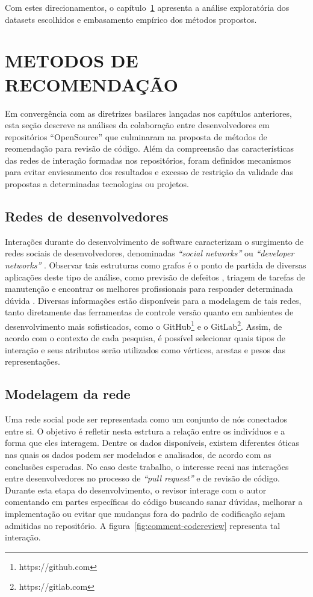 \documentclass[12pt,openany,oneside,a4paper,english,brazil]{abntbibufjf}
\begin{document}
Com estes direcionamentos, o capítulo~\ref{chap:metodos} apresenta a análise exploratória dos datasets escolhidos e embasamento empírico dos métodos propostos.

\chapter{METODOS DE RECOMENDAÇÃO}\label{chap:metodos}

Em convergência com as diretrizes basilares lançadas nos capítulos anteriores, esta seção descreve as análises da colaboração entre desenvolvedores em repositórios ``OpenSource'' que culminaram na proposta de métodos de reomendação para revisão de código. Além da compreensão das características das redes de interação formadas nos repositórios, foram definidos mecanismos para evitar enviesamento dos resultados e excesso de restrição da validade das propostas a determinadas tecnologias ou projetos.

\section{Redes de desenvolvedores}

Interações durante do desenvolvimento de software caracterizam o surgimento de redes sociais de desenvolvedores, denominadas \textit{``social networks''} ou \textit{``developer networks''} \cite{lopez2004}. Observar tais estruturas como grafos é o ponto de partida de diversas aplicações deste tipo de análise, como previsão de defeitos \cite{meneely2008}, triagem de tarefas de manutenção \cite{zhang2012} e encontrar os melhores profissionais para responder determinada dúvida \cite{li2010}. Diversas informações estão disponíveis para a modelagem de tais redes, tanto diretamente das ferramentas de controle versão quanto em ambientes de desenvolvimento mais sofisticados, como o GitHub\footnote{https://github.com} e o GitLab\footnote{https://gitlab.com}. Assim, de acordo com o contexto de cada pesquisa, é possível selecionar quais tipos de interação e seus atributos serão utilizados como vértices, arestas e pesos das representações.

\section{Modelagem da rede}
Uma rede social pode ser representada como um conjunto de nós conectados entre si. O objetivo é refletir nesta estrtura a relação entre os indivíduos e a forma que eles interagem. Dentre os dados disponíveis, existem diferentes óticas nas quais os dados podem ser modelados e analisados, de acordo com as conclusões esperadas. No caso deste trabalho, o interesse recai nas interações entre desenvolvedores no processo de \textit{``pull request''} e de revisão de código. Durante esta etapa do desenvolvimento, o revisor interage com o autor comentando em partes específicas do código buscando sanar dúvidas, melhorar a implementação ou evitar que mudanças fora do padrão de codificação sejam admitidas no repositório. A figura~\ref{fig:comment-codereview} representa tal interação.
\end{document}
